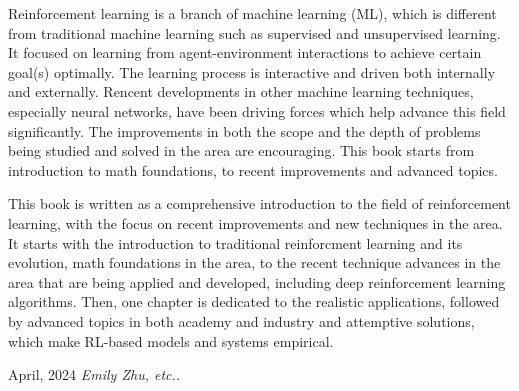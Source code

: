 %
%

\preface
\vspace{-\baselineskip}
\vspace{-\baselineskip}
\vspace{-\baselineskip}
\vspace{-\baselineskip}
\vspace{-\baselineskip}
\vspace{-\baselineskip}
\vspace{-\baselineskip}
\vspace{-\baselineskip}
Reinforcement learning is a branch of machine learning (ML), which is different from traditional machine learning such as supervised and unsupervised learning. 
It focused on learning from agent-environment interactions to achieve certain goal(s) optimally. The learning process is interactive and driven both internally and externally.
Rencent developments in other machine learning techniques, especially neural networks, have been driving forces which help advance this field significantly. 
The improvements in both the scope and the depth of problems being studied and solved in the area are encouraging.
This book starts from introduction to math foundations, to recent improvements and advanced topics.
\vspace{\baselineskip}


\noindent This book is written as a comprehensive introduction to the field of reinforcement learning, with the focus on recent improvements and new techniques in the area. 
It starts with the introduction to traditional reinforcment learning and its evolution, math foundations in the area, to the recent technique advances in the area 
that are being applied and developed, including deep reinforcement learning algorithms. Then, one chapter is dedicated to the realistic applications,
followed by advanced topics in both academy and industry and attemptive solutions, which make RL-based models and systems empirical.



\vspace{\baselineskip}
\begin{flushright}\noindent
April, 2024 \hfill {\it Emily Zhu, etc..}\\
\end{flushright}


